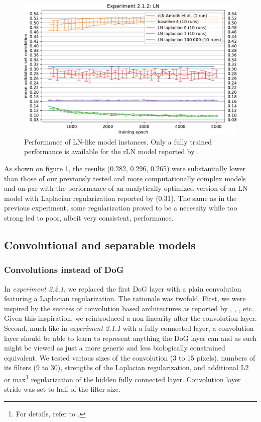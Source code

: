 \begin{figure}[H]
    \centering
    \includegraphics[width=1\textwidth]{../figures/05_2_1_2}
    \caption[Experiment 2.1.2]{Performance of LN-like model instances. Only a fully trained performance is available for the rLN model reported by \citeauthor{antolik}\protect\footnotemark.}
    \label{fig:5.2.1.2}
\end{figure}

As shown on figure \ref{fig:5.2.1.2}, the results (0.282, 0.296, 0.265) were substantially lower than those of our previously tested and more computationally complex models and on-par with the performance of an analytically optimized version of an LN model with Laplacian regularization reported by \cite{antolik} (0.31). The same as in the previous experiment, some regularization proved to be a necessity while too strong led to poor, albeit very consistent, performance.

\subsection{Convolutional and separable models}
\subsubsection{Convolutions instead of DoG}

In \textit{experiment 2.2.1}, we replaced the first DoG layer with a plain convolution featuring a Laplacian regularization. The rationale was twofold. First, we were inspired by the success of convolution based architectures as reported by \cite{klindt}, \cite{ecker}, \cite{Walke506956}, etc. Given this inspiration, we reintroduced a non-linearity after the convolution layer. Second, much like in \textit{experiment 2.1.1} with a fully connected layer, a convolution layer should be able to learn to represent anything the DoG layer can and as such might be viewed as just a more generic and less biologically constrained equivalent. We tested various sizes of the convolution (3 to 15 pixels), numbers of its filters (9 to 30), strengths of the Laplacian regularization, and additional L2 or max\footnote{For details, refer to .} regularization of the hidden fully connected layer. Convolution layer stride was set to half of the filter size.

